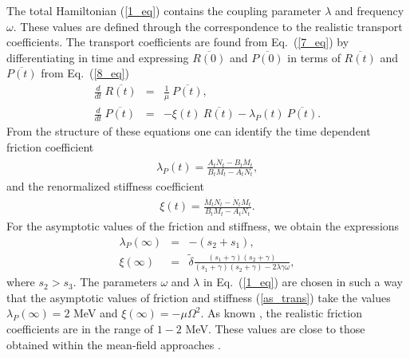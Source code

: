 \documentclass[preprint,review,12pt]{elsarticle}
\begin{document}
  The total Hamiltonian (\ref{1_eq}) contains the coupling parameter $\lambda$ and frequency $\omega$. These values
  are defined through the correspondence to the realistic transport coefficients.
  The transport coefficients are found from Eq.~(\ref{7_eq}) by differentiating in time and expressing $\overline{R(0)}$ and $\overline{P(0)}$  in terms of $\overline{R(t)}$ and $\overline{P(t)}$ from Eq.~(\ref{8_eq})
  \begin{eqnarray}
  \frac{d}{dt}\ \overline{R(t)}&=&\frac{1}{\mu}\ \overline{P(t)},\nonumber\\
  \frac{d}{dt}\ \overline{P(t)}&=&-\xi (t)\ \overline{R(t)}-\lambda_P(t)\ \overline{P(t)}.
  \label{14_eq}
  \end{eqnarray}
  From the structure of these equations one can identify the time dependent friction coefficient
  \begin{eqnarray}
  \lambda_P(t)=\frac{A_t{\dot N}_t - B_t{\dot M}_t }
  {B_tM_t - A_tN_t},
  \label{15b_eq}
  \end{eqnarray}
  and the renormalized stiffness coefficient
  \begin{eqnarray}
  \xi (t) = \frac{{\dot M}_t N_t - {\dot N}_tM_t}
  {B_tM_t - A_tN_t}.
  \label{15d_eq}
  \end{eqnarray}
  For the asymptotic values of the friction and stiffness,
  we obtain the expressions
\begin{eqnarray}
   \lambda_P(\infty)&=&-(s_2+s_1),  \nonumber \\
  \xi (\infty)&=&\tilde\delta\frac{(s_1+\gamma)(s_2+\gamma)}{(s_1+\gamma)(s_2+\gamma)-
  2\lambda\gamma\omega},
  \label{as_trans}
  \end{eqnarray}
  where $s_2>s_3$. The parameters $\omega$ and $\lambda$ in Eq.~(\ref{1_eq}) are chosen in such a way that the asymptotic values of friction and stiffness (\ref{as_trans}) take the values $\lambda_P(\infty)=2$ MeV and $\xi (\infty)=-\mu \Omega^2$. As known \cite{PRC2,PRC1}, the realistic friction coefficients are in the range of $1-2$ MeV.
  These values are close to those obtained within the mean-field approaches \cite{Wash,Ayik1}.
\end{document}
